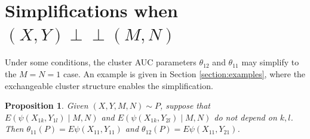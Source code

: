 \documentclass[12pt]{article}
\DeclareMathOperator{\AUC}{AUC}
\newcommand{\E}{E}
\renewcommand{\P}{P}
\newcommand{\cind}{\perp \!\!\! \perp}
\newcommand{\aucindiv}{\theta_{11}}%
\newcommand{\aucpop}{\theta_{12}}%
\newcommand{\kernel}{\psi}
\newtheorem{proposition}[theorem]{Proposition}
\begin{document}
\section{Simplifications when $(X,Y)\cind (M,N)$}\label{section:simplifications}

Under some conditions, the cluster AUC parameters $\aucpop$ and
$\aucindiv$ may simplify to the $M=N=1$ case. An example is given in
Section \ref{section:examples}, where the exchangeable cluster structure
enables the simplification.
\begin{proposition}\label{proposition:reduction} Given
  $(X,Y,M,N)\sim \P$, suppose
  that $\E(\kernel(X_{1k},Y_{1l})\mid M,N)$ and $\E(\kernel(X_{1k},Y_{2l})\mid M,N)$ do
  not depend on $k,l$. Then $\aucindiv(\P)=\E\kernel(X_{11},Y_{11})$
  and $\aucpop(\P)=\E\kernel(X_{11},Y_{21})$.
\end{proposition}


\end{document}
